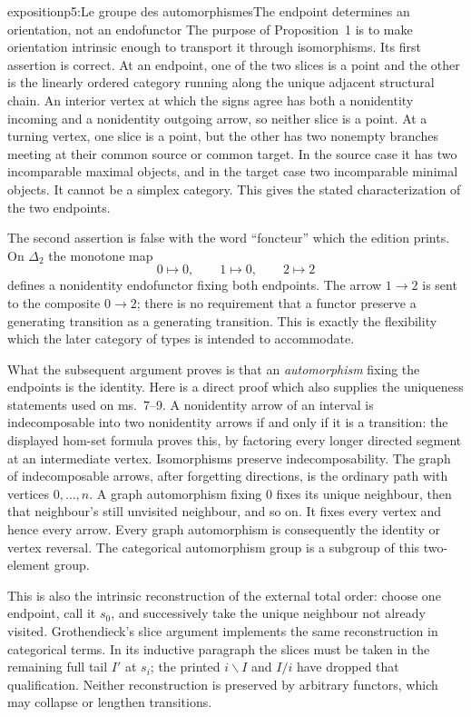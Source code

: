 \begin{dcomment}{exposition}{p5:Le groupe des automorphismes}{The endpoint determines an orientation, not an endofunctor}
The purpose of Proposition~1 is to make orientation intrinsic enough to transport it through isomorphisms. Its first assertion is correct. At an endpoint, one of the two slices is a point and the other is the linearly ordered category running along the unique adjacent structural chain. An interior vertex at which the signs agree has both a nonidentity incoming and a nonidentity outgoing arrow, so neither slice is a point. At a turning vertex, one slice is a point, but the other has two nonempty branches meeting at their common source or common target. In the source case it has two incomparable maximal objects, and in the target case two incomparable minimal objects. It cannot be a simplex category. This gives the stated characterization of the two endpoints.

The second assertion is false with the word ``foncteur'' which the edition prints. On $\Delta_2$ the monotone map
\[
 0\longmapsto0,\qquad1\longmapsto0,\qquad2\longmapsto2
\]
defines a nonidentity endofunctor fixing both endpoints. The arrow $1\to2$ is sent to the composite $0\to2$; there is no requirement that a functor preserve a generating transition as a generating transition. This is exactly the flexibility which the later category of types is intended to accommodate.

What the subsequent argument proves is that an \emph{automorphism} fixing the endpoints is the identity. Here is a direct proof which also supplies the uniqueness statements used on ms.~7--9. A nonidentity arrow of an interval is indecomposable into two nonidentity arrows if and only if it is a transition: the displayed hom-set formula proves this, by factoring every longer directed segment at an intermediate vertex. Isomorphisms preserve indecomposability. The graph of indecomposable arrows, after forgetting directions, is the ordinary path with vertices $0,\ldots,n$. A graph automorphism fixing $0$ fixes its unique neighbour, then that neighbour's still unvisited neighbour, and so on. It fixes every vertex and hence every arrow. Every graph automorphism is consequently the identity or vertex reversal. The categorical automorphism group is a subgroup of this two-element group.

This is also the intrinsic reconstruction of the external total order: choose one endpoint, call it $s_0$, and successively take the unique neighbour not already visited. Grothendieck's slice argument implements the same reconstruction in categorical terms. In its inductive paragraph the slices must be taken in the remaining full tail $I'$ at $s_i$; the printed $i\backslash I$ and $I/i$ have dropped that qualification. Neither reconstruction is preserved by arbitrary functors, which may collapse or lengthen transitions.


\end{dcomment}
